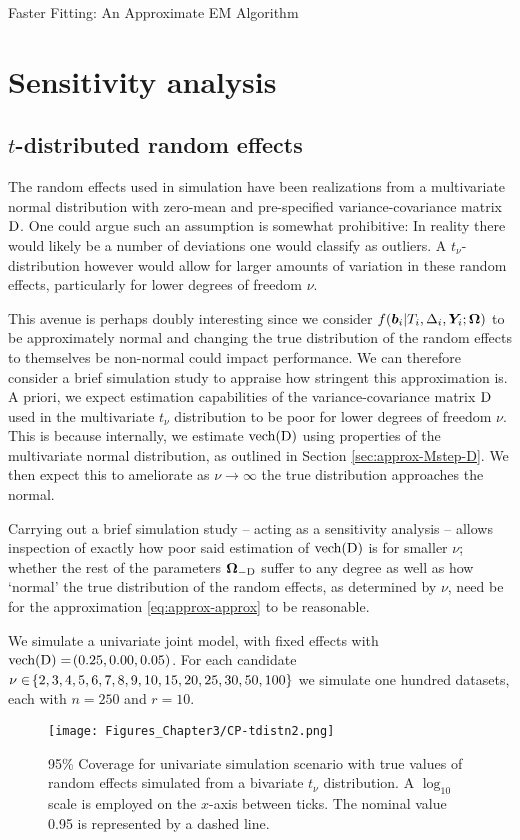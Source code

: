 \begin{chapter}{\label{cha:approx}Faster Fitting: An Approximate EM Algorithm}
  \section{Sensitivity analysis}\label{sec:approx-sens}
  \subsection{\texorpdfstring{$t$-distributed random effects}{REs}}\label{sec:approx-sens-tREs}
  The random effects used in simulation have been realizations from a multivariate normal distribution with zero-mean and pre-specified variance-covariance matrix $\mathrm{D}$. One could argue such an assumption is somewhat prohibitive: In reality there would likely be a number of deviations one would classify as outliers. A $t_\nu$-distribution however would allow for larger amounts of variation in these random effects, particularly for lower degrees of freedom $\nu$.

  This avenue is perhaps doubly interesting since we consider $f\!\left(\bm{b}_i|T_i, \Delta_i, \bm{Y}_i; \bm{\mathrm{\Omega}}\right)$ to be approximately normal and changing the true distribution of the random effects to themselves be non-normal could impact performance. We can therefore consider a brief simulation study to appraise how stringent this approximation is. A priori, we expect estimation capabilities of the variance-covariance matrix $\mathrm{D}$ used in the multivariate $t_\nu$ distribution to be poor for lower degrees of freedom $\nu$. This is because internally, we estimate $\text{vech}\!\left(\mathrm{D}\right)$ using properties of the multivariate normal distribution, as outlined in Section \ref{sec:approx-Mstep-D}. We then expect this to ameliorate as $\nu\rightarrow\infty$ \ie the true distribution approaches the normal.
  
  Carrying out a brief simulation study -- acting as a sensitivity analysis -- allows inspection of exactly how poor said estimation of $\text{vech}\!\left(\mathrm{D}\right)$ is for smaller $\nu$; whether the rest of the parameters $\bm{\mathrm{\Omega}}_{-\mathrm{D}}$ suffer to any degree as well as how `normal' the true distribution of the random effects, as determined by $\nu$, need be for the approximation \eqref{eq:approx-approx} to be reasonable.
  
  We simulate a univariate joint model, with fixed effects with $\text{vech}\!\left(\mathrm{D}\right)=\!\left(0.25,0.00,0.05\right)$. For each candidate $\nu\in\!\left\{2, 3, 4, 5, 6, 7, 8, 9, 10,15, 20, 25, 30, 50, 100\right\}$ we simulate one hundred datasets, each with $n=250$ and $r=10$.

  \begin{figure}[t]
      \centering
      \texttt{[image: Figures\_Chapter3/CP-tdistn2.png]}
      \caption{95\% Coverage for univariate simulation scenario with true values of random effects simulated from a bivariate $t_\nu$ distribution. A $\log_{10}$ scale is employed on the $x$-axis between ticks. The nominal value 0.95 is represented by a dashed line.}
      \label{fig:approx-sens-t-CP}
  \end{figure}
  

\end{chapter}

